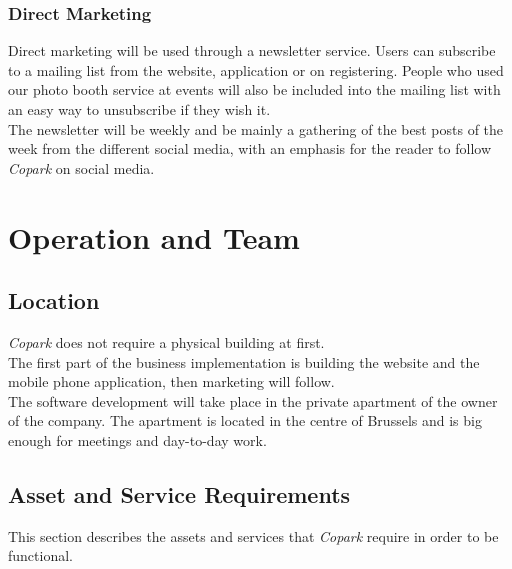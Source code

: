 \documentclass[12pt,a4paper,oneside]{book}
\newcommand{\bp}{\textit{Copark}}
\begin{document}
\subsection{Direct Marketing}

Direct marketing will be used through a newsletter service. Users can subscribe to a mailing list from the website, application or on registering. People who used our photo booth service at events will also be included into the mailing list with an easy way to unsubscribe if they wish it.\\

The newsletter will be weekly and be mainly a gathering of the best posts of the week from the different social media, with an emphasis for the reader to follow \bp{} on social media.

\chapter{Operation and Team}
\label{otch}

\section{Location}
\bp{} does not require a physical building at first.\\

The first part of the business implementation is building the website and the mobile phone application, then marketing will follow.\\

The software development will take place in the private apartment of the owner of the company. The apartment is located in the centre of Brussels and is big enough for meetings and day-to-day work.\\

\section{Asset and Service Requirements}
This section describes the assets and services that \bp{} require in order to be functional.
\end{document}
